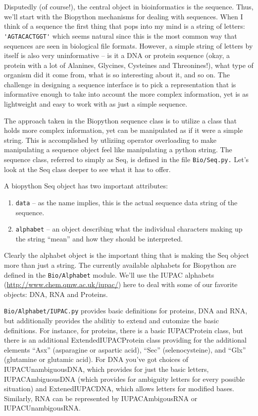 \documentclass[dvips]{article}
\begin{document}
Disputedly (of course!), the central object in bioinformatics is the sequence. Thus, we'll start with the Biopython mechanisms for dealing with sequences. When I think of a sequence the first thing that pops into my mind is a string of letters:\verb| 'AGTACACTGGT'| which seems natural since this is the most common way that sequences are seen in biological file formats.  However, a simple string of letters by itself is also very uninformative -- is it a DNA or  protein sequence (okay, a protein with a lot of Alanines, Glycines, Cysteines and Threonines!), what type of organism did it come from, what is so interesting about it, and so on. The challenge in designing a sequence interface is to pick a representation that is informative enough to take into account the more complex information, yet is as lightweight and easy to work with as just a simple sequence.


The approach taken in the Biopython sequence class is to utilize a class that holds more complex information, yet can be manipulated as if it were a simple string. This is accomplished by utliziing operator overloading to make manipulating a sequence object feel like manipulating a python string. The sequence class, referred to simply as Seq,  is defined in the file \verb|Bio/Seq.py.| Let's look at the Seq class deeper to see what it has to offer.


A biopython Seq object has two important attributes:

\begin{enumerate}

\item \verb|data| -- as the name implies, this is the actual sequence data string of the sequence.

\item \verb|alphabet| -- an object describing what the individual characters making up the string ``mean'' and how they should be interpreted.

\end{enumerate}

Clearly the alphabet object is the important thing that is making the Seq object more than just a string. The currently available alphabets for Biopython are defined in the \verb|Bio/Alphabet| module. We'll use the IUPAC alphabets \ahrefurl ({\url{http://www.chem.qmw.ac.uk/iupac/}}) here to deal with some of our favorite objects: DNA, RNA and Proteins.  


\verb|Bio/Alphabet/IUPAC.py| provides basic definitions for proteins, DNA and RNA, but additionally provides the abilitiy to extend and cutomize the basic definitions. For instance, for proteins, there is a basic IUPACProtein class, but there is an additional ExtendedIUPACProtein class providing for the additional elements ``Asx'' (asparagine or aspartic acid), ``Sec'' (selenocysteine), and ``Glx'' (glutamine or glutamic acid). For DNA you've got choices of IUPACUnambiguousDNA, which provides for just the basic letters, IUPACAmbiguousDNA (which provides for ambiguity letters for every possible situation) and ExtenedIUPACDNA, which allows letters for modified bases. Similarly, RNA can be represented by IUPACAmbigousRNA or IUPACUnambigousRNA.
\end{document}
